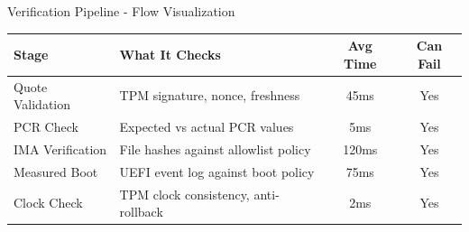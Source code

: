 \begin{frame}{Verification Pipeline - Flow Visualization}
\begin{center}
  \end{center}

  \vspace{0.1cm}

  \scriptsize
  \begin{center}
    \begin{tabular}{|l|p{4.5cm}|c|c|}
      \hline
      \textbf{Stage} & \textbf{What It Checks} & \textbf{Avg Time} & \textbf{Can Fail} \\
      \hline
      Quote Validation & TPM signature, nonce, freshness & 45ms & Yes \\
      \hline
      PCR Check & Expected vs actual PCR values & 5ms & Yes \\
      \hline
      IMA Verification & File hashes against allowlist policy & 120ms & Yes \\
      \hline
      Measured Boot & UEFI event log against boot policy & 75ms & Yes \\
      \hline
      Clock Check & TPM clock consistency, anti-rollback & 2ms & Yes \\
      \hline
    \end{tabular}
  \end{center}
\end{frame}

